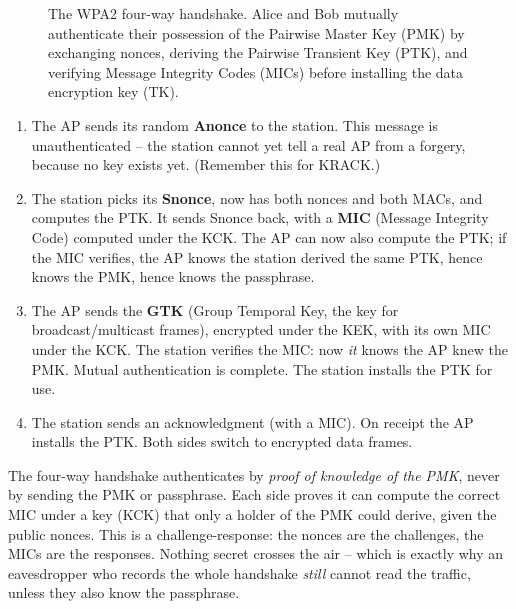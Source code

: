 \begin{figure}[H]
\caption{The WPA2 four-way handshake. Alice and Bob mutually authenticate their possession of the
Pairwise Master Key (PMK) by exchanging nonces, deriving the Pairwise Transient Key (PTK),
and verifying Message Integrity Codes (MICs) before installing the data encryption key (TK).}
\label{ch26:fig-wpa2-handshake}
\end{figure}

\begin{enumerate}
  \item[\textbf{M1}] The AP sends its random \textbf{Anonce} to the station. This
        message is unauthenticated -- the station cannot yet tell a real AP from a
        forgery, because no key exists yet. (Remember this for KRACK.)
  \item[\textbf{M2}] The station picks its \textbf{Snonce}, now has both nonces
        and both MACs, and computes the PTK. It sends Snonce back, with a
        \textbf{MIC} (Message Integrity Code) computed under the KCK. The AP can
        now also compute the PTK; if the MIC verifies, the AP knows the station
        derived the same PTK, hence knows the PMK, hence knows the passphrase.
  \item[\textbf{M3}] The AP sends the \textbf{GTK} (Group Temporal Key, the key
        for broadcast/multicast frames), encrypted under the KEK, with its own
        MIC under the KCK. The station verifies the MIC: now \emph{it} knows the
        AP knew the PMK. Mutual authentication is complete. The station installs
        the PTK for use.
  \item[\textbf{M4}] The station sends an acknowledgment (with a MIC). On receipt
        the AP installs the PTK. Both sides switch to encrypted data frames.
\end{enumerate}

\begin{focusbox}
The four-way handshake authenticates by \emph{proof of knowledge of the PMK},
never by sending the PMK or passphrase. Each side proves it can compute the
correct MIC under a key (KCK) that only a holder of the PMK could derive, given
the public nonces. This is a challenge-response: the nonces are the challenges,
the MICs are the responses. Nothing secret crosses the air -- which is exactly why
an eavesdropper who records the whole handshake \emph{still} cannot read the
traffic, unless they also know the passphrase.
\end{focusbox}

